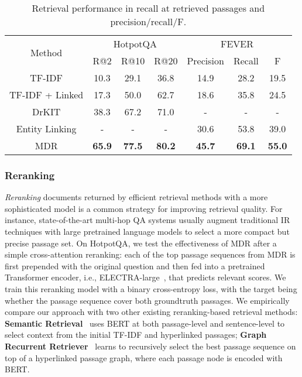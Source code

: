 \documentclass{article} \usepackage{iclr2021_conference,times}
\newcommand{\method}{MDR\xspace}
\begin{document}
\begin{table}
    \centering
    \small
    \vspace{-0.4in}
    \caption{Retrieval performance in recall at  retrieved passages and precision/recall/F.}
    \begin{tabular}{c|ccc|ccc}
    \toprule
        \multirow{2}{*}{Method} & \multicolumn{3}{c|}{HotpotQA} & \multicolumn{3}{c}{FEVER} \\
        & R@2 & R@10 & R@20 & Precision & Recall & F \\ 
        \midrule
    TF-IDF & 10.3 & 29.1 & 36.8 & 14.9 & 28.2 & 19.5 \\
    TF-IDF + Linked  & 17.3 & 50.0 & 62.7 & 18.6 & 35.8 & 24.5 \\
    DrKIT & 38.3 &  67.2 & 71.0 & - & - & - \\
    Entity Linking & - & - & - & 30.6 & 53.8 & 39.0\\
    \midrule
    \method & \textbf{65.9} & \textbf{77.5} & \textbf{80.2} & \textbf{45.7} & \textbf{69.1} & \textbf{55.0}\\
    \bottomrule
    \end{tabular}
    \vspace{-0.2in}
    \label{tab:efficient_baselines}
\end{table}
 
\subsubsection{Reranking}
\label{sec:reranking}

\emph{Reranking} documents returned by efficient retrieval methods with a more sophisticated model is a common strategy for improving retrieval quality.
For instance, state-of-the-art multi-hop QA systems usually augment traditional IR techniques with large pretrained language models to select a more compact but precise passage set.
On HotpotQA, we test the effectiveness of \method after a simple cross-attention reranking: each of the top  passage sequences from \method is first prepended with the original question and then fed into a pretrained Transformer encoder, i.e., ELECTRA-large~\citep{ELECTRA}, that predicts relevant scores. We train this reranking model with a binary cross-entropy loss, with the target being whether the passage sequence cover both groundtruth passages.
We empirically compare our approach with two other existing reranking-based retrieval methods:
\textbf{Semantic Retrieval}~\citep{SMR} uses BERT at both passage-level and sentence-level to select context from the initial TF-IDF and hyperlinked passages; \textbf{Graph Recurrent Retriever}~\citep{GraphRecurrentRetriever} learns to recursively select the best passage sequence on top of a hyperlinked passage graph, where each passage node is encoded with BERT.
\end{document}
